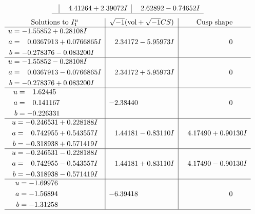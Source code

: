 \documentclass[1p]{elsarticle_modified}
\theoremstyle{definition}
\newcommand{\I}{\sqrt{-1}}
\begin{document}
$$\begin{array}{c|c|c}
 & \phantom{-}4.41264 + 2.39072 I & \phantom{-}2.62892 - 0.74652 I\\
 \hline 
 \end{array}$$\newpage$$\begin{array}{c|c|c}  
\text{Solutions to }I^u_{1}& \I (\text{vol} + \sqrt{-1}CS) & \text{Cusp shape}\\
 \hline 
\begin{aligned}
u &= -1.55852 + 0.28108 I \\
a &= \phantom{-}0.0367913 + 0.0766865 I \\
b &= -0.278376 - 0.083200 I\end{aligned}
 & \phantom{-}2.34172 - 5.95973 I & \phantom{-0.000000 } 0 \\ \hline\begin{aligned}
u &= -1.55852 - 0.28108 I \\
a &= \phantom{-}0.0367913 - 0.0766865 I \\
b &= -0.278376 + 0.083200 I\end{aligned}
 & \phantom{-}2.34172 + 5.95973 I & \phantom{-0.000000 } 0 \\ \hline\begin{aligned}
u &= \phantom{-}1.62445\phantom{ +0.000000I} \\
a &= \phantom{-}0.141167\phantom{ +0.000000I} \\
b &= -0.226331\phantom{ +0.000000I}\end{aligned}
 & -2.38440\phantom{ +0.000000I} & \phantom{-0.000000 } 0 \\ \hline\begin{aligned}
u &= -0.246531 + 0.228188 I \\
a &= \phantom{-}0.742955 + 0.543557 I \\
b &= -0.318938 + 0.571419 I\end{aligned}
 & \phantom{-}1.44181 - 0.83110 I & \phantom{-}4.17490 + 0.90130 I \\ \hline\begin{aligned}
u &= -0.246531 - 0.228188 I \\
a &= \phantom{-}0.742955 - 0.543557 I \\
b &= -0.318938 - 0.571419 I\end{aligned}
 & \phantom{-}1.44181 + 0.83110 I & \phantom{-}4.17490 - 0.90130 I \\ \hline\begin{aligned}
u &= -1.69976\phantom{ +0.000000I} \\
a &= -1.56894\phantom{ +0.000000I} \\
b &= -1.31258\phantom{ +0.000000I}\end{aligned}
 & -6.39418\phantom{ +0.000000I} & \phantom{-0.000000 } 0\\
 \hline 
 \end{array}$$\newpage\newpage\renewcommand{\arraystretch}{1}
\end{document}
